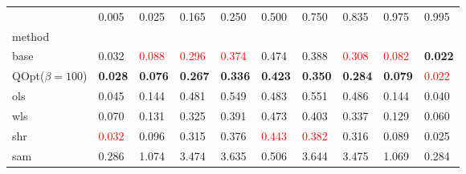 \begin{tabular}{llllllllll}
\toprule
 & 0.005 & 0.025 & 0.165 & 0.250 & 0.500 & 0.750 & 0.835 & 0.975 & 0.995 \\
method &  &  &  &  &  &  &  &  &  \\
\midrule
base & 0.032 & \textcolor{red}{0.088} & \textcolor{red}{0.296} & \textcolor{red}{0.374} & 0.474 & 0.388 & \textcolor{red}{0.308} & \textcolor{red}{0.082} & \textbf{0.022} \\
\midrule
QOpt($\beta=100$) & \textbf{0.028} & \textbf{0.076} & \textbf{0.267} & \textbf{0.336} & \textbf{0.423} & \textbf{0.350} & \textbf{0.284} & \textbf{0.079} & \textcolor{red}{0.022} \\
ols & 0.045 & 0.144 & 0.481 & 0.549 & 0.483 & 0.551 & 0.486 & 0.144 & 0.040 \\
wls & 0.070 & 0.131 & 0.325 & 0.391 & 0.473 & 0.403 & 0.337 & 0.129 & 0.060 \\
shr & \textcolor{red}{0.032} & 0.096 & 0.315 & 0.376 & \textcolor{red}{0.443} & \textcolor{red}{0.382} & 0.316 & 0.089 & 0.025 \\
sam & 0.286 & 1.074 & 3.474 & 3.635 & 0.506 & 3.644 & 3.475 & 1.069 & 0.284 \\
\bottomrule
\end{tabular}